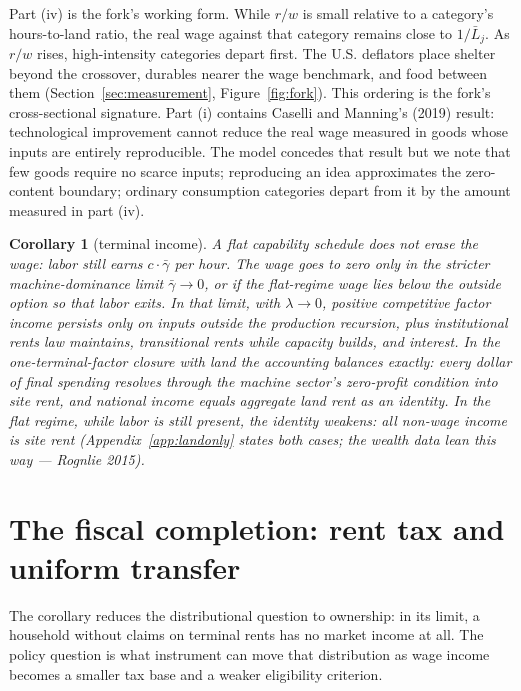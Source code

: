 \documentclass[12pt]{article}
\theoremstyle{plain}
\newtheorem*{corollary}{Corollary}
\begin{document}
Part (iv) is the fork's working form. While $r/w$ is small relative to a category's hours-to-land ratio, the real wage against that category remains close to $1/\bar{L}_j$. As $r/w$ rises, high-intensity categories depart first. The U.S. deflators place shelter beyond the crossover, durables nearer the wage benchmark, and food between them (Section~\ref{sec:measurement}, Figure~\ref{fig:fork}). This ordering is the fork's cross-sectional signature. Part (i) contains Caselli and Manning's (2019) result: technological improvement cannot reduce the real wage measured in goods whose inputs are entirely reproducible. The model concedes that result but we note that few goods require no scarce inputs; reproducing an idea approximates the zero-content boundary; ordinary consumption categories depart from it by the amount measured in part (iv).

\begin{corollary}[terminal income]
A flat capability schedule does not erase the wage: labor still earns $c\cdot\bar{\gamma}$ per hour. The wage goes to zero only in the stricter machine-dominance limit $\bar{\gamma}\to0$, or if the flat-regime wage lies below the outside option so that labor exits. In that limit, with $\lambda \to 0$, positive competitive factor income persists only on inputs outside the production recursion, plus institutional rents law maintains, transitional rents while capacity builds, and interest. In the one-terminal-factor closure with land the accounting balances exactly: every dollar of final spending resolves through the machine sector's zero-profit condition into site rent, and national income equals aggregate land rent as an identity. In the flat regime, while labor is still present, the identity weakens: all non-wage income is site rent (Appendix~\ref{app:landonly} states both cases; the wealth data lean this way --- Rognlie 2015).
\end{corollary}

\section{The fiscal completion: rent tax and uniform transfer}\label{sec:fiscal}

The corollary reduces the distributional question to ownership: in its limit, a household without claims on terminal rents has no market income at all. The policy question is what instrument can move that distribution as wage income becomes a smaller tax base and a weaker eligibility criterion.
\end{document}
